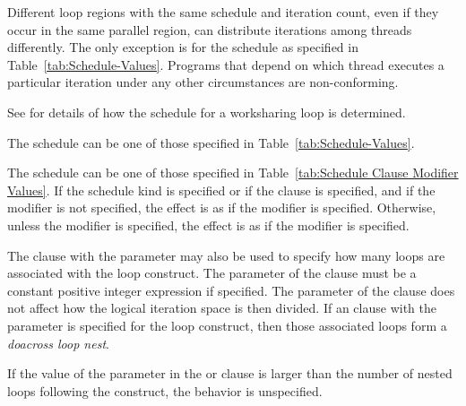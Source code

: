 Different loop regions with the same schedule and iteration count, even if
they occur in the same parallel region, can distribute iterations among
threads differently. The only exception is for the  schedule
as specified in Table~\ref{tab:Schedule-Values}. Programs that depend
on which thread executes a particular iteration under any other circumstances
are non-conforming.

See 
for details of how the schedule for a worksharing loop is
determined.

The schedule  can be one of those specified in
Table~\ref{tab:Schedule-Values}.

The schedule  can be one of those specified in
Table~\ref{tab:Schedule Clause Modifier Values}. If the
 schedule kind is specified or if the 
clause is specified, and if the  modifier is
not specified, the effect is as if the  modifier
is specified. Otherwise, unless the  modifier is
specified, the effect is as if the  modifier
is specified.

The  clause with the parameter may also be used to specify
how many loops are associated with the loop construct. The parameter of
the  clause must be a constant positive integer expression
if specified. The parameter of the  clause does not
affect how the logical iteration space is then divided. If an 
clause with the parameter is specified for the loop construct, then those
associated loops form a \emph{doacross loop nest}.

If the value of the parameter in the  or 
clause is larger than the number of nested loops following the construct,
the behavior is unspecified.

